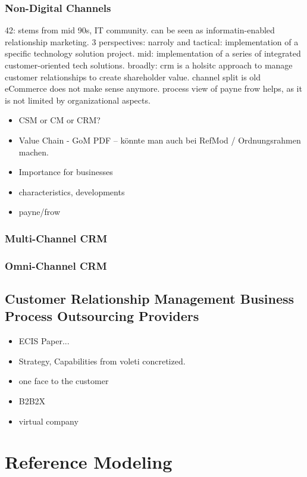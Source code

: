 		\subsubsection{Non-Digital Channels}
		
		42: stems from mid 90s, IT community. can be seen as informatin-enabled relationship marketing. 3 perspectives: narroly and tactical: implementation of a specific technology solution project. mid: implementation of a series of integrated customer-oriented tech solutions. broadly: crm is a holsitc approach to manage customer relationships to create shareholder value. channel split is old eCommerce does not make sense anymore.
		process view of payne frow helps, as it is not limited by organizational aspects. 
				\begin{itemize}
			\item CSM or CM or CRM?
			\item Value Chain - GoM PDF -- könnte man auch bei RefMod / Ordnungsrahmen machen. 			
			\item Importance for businesses
			\item characteristics, developments 
			\item payne/frow
		\end{itemize}
	
	\subsubsection{Multi-Channel CRM}
	\subsubsection{Omni-Channel CRM}
	 
		\subsection{Customer Relationship Management Business Process Outsourcing Providers}
		\begin{itemize}
			\item ECIS Paper...
			\item Strategy, Capabilities from voleti concretized. 
			\item one face to the customer
			\item B2B2X
			\item virtual company
		\end{itemize}
	\section{Reference Modeling}
